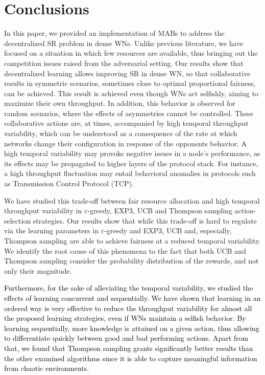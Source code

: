 \documentclass{article}
\begin{document}
	\section{Conclusions }
	\label{section:conclusions}
	In this paper, we provided an implementation of MABs to address the decentralized SR problem in dense WNs. Unlike previous literature, we have focused on a situation in which few resources are available, thus bringing out the competition issues raised from the adversarial setting. Our results show that decentralized learning allows improving SR in dense WN, so that collaborative results in symmetric scenarios, sometimes close to optimal proportional fairness, can be achieved. This result is achieved even though WNs act selfishly, aiming to maximize their own throughput. In addition, this behavior is observed for random scenarios, where the effects of asymmetries cannot be controlled. %
	These collaborative actions are, at times, accompanied by high temporal throughput variability, which can be understood as a consequence of the  rate at which networks change their configuration in response of the opponents behavior. A high temporal variability may provoke negative issues in a node's performance, as its effects may be propagated to higher layers of the protocol stack. For instance, a high throughput fluctuation may entail behavioral anomalies in protocols such as Transmission Control Protocol (TCP). 
	
	We have studied this trade-off between fair resource allocation and high temporal throughput variability in $\varepsilon$-greedy, EXP3, UCB and Thompson sampling action-selection strategies. Our results show that while this trade-off is hard to regulate via the learning parameters in $\varepsilon$-greedy and EXP3, UCB  and, especially, Thompson sampling are able to achieve fairness at a reduced temporal variability. We identify the root cause of this phenomena to the fact that both UCB and Thompson sampling consider the probability distribution of the rewards, and not only their magnitude.
	
	\textcolor{black}{Furthermore, for the sake of alleviating the temporal variability, we studied the effects of learning concurrent and sequentially. We have shown that learning in an ordered way is very effective to reduce the throughput variability for almost all the proposed learning strategies, even if WNs maintain a selfish behavior. By learning sequentially, more knowledge is attained on a given action, thus allowing to differentiate quickly between good and bad performing actions. \textcolor{black}{Apart from that, we found that Thompson sampling grants significantly better results than the other examined algorithms since it is able to capture meaningful information from chaotic environments.}}
	
\end{document}

